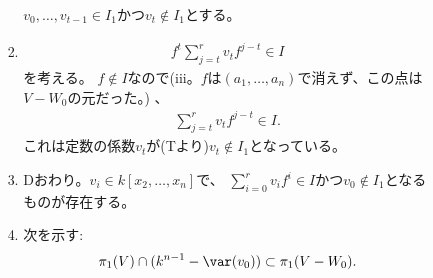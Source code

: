 \begin{enumerate}
\begin{enumerate}
\begin{enumerate}
\begin{enumerate}
        $v_0,\dots,v_{t-1}\in I_1$かつ$v_t \notin I_1$とする。
        \item
        \begin{align}
          f^t \sum_{j=t}^r v_t f^{j-t} \in I
        \end{align}
        を考える。
        $f\notin I$なので(iii。$f$は$(a_1,\dots,a_n)$で消えず、この点は$V-W_0$の元だった。)
        、
        \begin{align}
          \sum_{j=t}^r v_t f^{j-t} \in I.
        \end{align}
        これは定数の係数$v_t$が(Tより)$v_t \notin I_1$となっている。
        \item
        Dおわり。$v_i \in k[x_2,\dots,x_n]$で、
        $\sum_{i=0}^r v_i f^i \in I$かつ$v_0 \notin I_1$となるものが存在する。
        \item
        次を示す:
        \begin{align}
          \pi_1(V) \cap (k^{n-1}-\var(v_0)) \subset \pi_1(V-W_0).
        \end{align}


\end{enumerate}
\end{enumerate}
\end{enumerate}
\end{enumerate}

